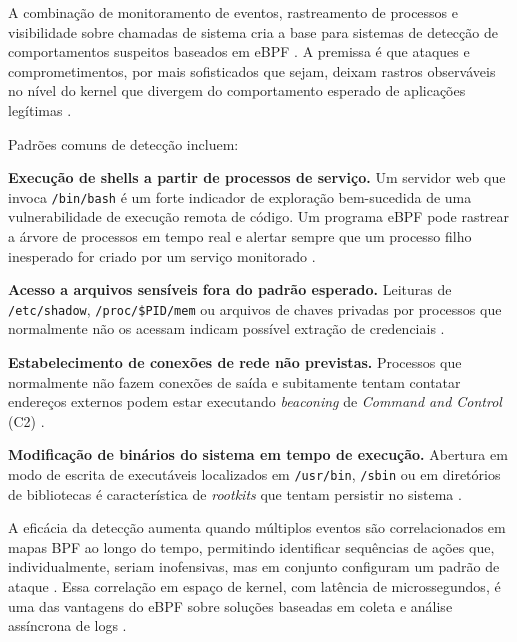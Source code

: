 A combinação de monitoramento de eventos, rastreamento de processos e visibilidade
sobre chamadas de sistema cria a base para sistemas de detecção de comportamentos
suspeitos baseados em eBPF \cite{majors2022}.
A premissa é que ataques e comprometimentos, por mais sofisticados que sejam, deixam
rastros observáveis no nível do kernel que divergem do comportamento esperado de
aplicações legítimas \cite{beyer2016}.

Padrões comuns de detecção incluem:

\textbf{Execução de shells a partir de processos de serviço.}
Um servidor web que invoca \texttt{/bin/bash} é um forte indicador de exploração
bem-sucedida de uma vulnerabilidade de execução remota de código.
Um programa eBPF pode rastrear a árvore de processos em tempo real e alertar
sempre que um processo filho inesperado for criado por um serviço monitorado
\cite{gregg2019}.

\textbf{Acesso a arquivos sensíveis fora do padrão esperado.}
Leituras de \texttt{/etc/shadow}, \texttt{/proc/\$PID/mem} ou arquivos de
chaves privadas por processos que normalmente não os acessam indicam possível
extração de credenciais \cite{manpages2024}.

\textbf{Estabelecimento de conexões de rede não previstas.}
Processos que normalmente não fazem conexões de saída e subitamente tentam
contatar endereços externos podem estar executando \textit{beaconing} de
\textit{Command and Control} (C2) \cite{cassagnes2020}.

\textbf{Modificação de binários do sistema em tempo de execução.}
Abertura em modo de escrita de executáveis localizados em \texttt{/usr/bin},
\texttt{/sbin} ou em diretórios de bibliotecas é característica de
\textit{rootkits} que tentam persistir no sistema \cite{gregg2020}.

A eficácia da detecção aumenta quando múltiplos eventos são correlacionados em
mapas BPF ao longo do tempo, permitindo identificar sequências de ações que,
individualmente, seriam inofensivas, mas em conjunto configuram um padrão de
ataque \cite{majors2022}.
Essa correlação em espaço de kernel, com latência de microssegundos, é uma das
vantagens do eBPF sobre soluções baseadas em coleta e análise assíncrona de logs
\cite{cassagnes2020}.